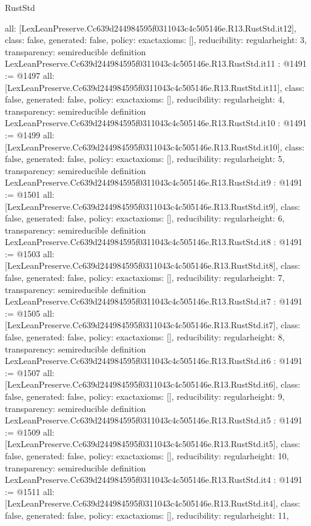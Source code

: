 \begin{lexlean}{RustStd}
\begin{coremodule}
{  all: [LexLeanPreserve.Cc639d244984595f0311043c4c505146e.R13.RustStd.it12],
  class: false,
  generated: false,
  policy: exact{axioms: []},
  reducibility: regular{height: 3},
  transparency: semireducible
}
definition LexLeanPreserve.Cc639d244984595f0311043c4c505146e.R13.RustStd.it11 : @1491 := @1497 {
  all: [LexLeanPreserve.Cc639d244984595f0311043c4c505146e.R13.RustStd.it11],
  class: false,
  generated: false,
  policy: exact{axioms: []},
  reducibility: regular{height: 4},
  transparency: semireducible
}
definition LexLeanPreserve.Cc639d244984595f0311043c4c505146e.R13.RustStd.it10 : @1491 := @1499 {
  all: [LexLeanPreserve.Cc639d244984595f0311043c4c505146e.R13.RustStd.it10],
  class: false,
  generated: false,
  policy: exact{axioms: []},
  reducibility: regular{height: 5},
  transparency: semireducible
}
definition LexLeanPreserve.Cc639d244984595f0311043c4c505146e.R13.RustStd.it9 : @1491 := @1501 {
  all: [LexLeanPreserve.Cc639d244984595f0311043c4c505146e.R13.RustStd.it9],
  class: false,
  generated: false,
  policy: exact{axioms: []},
  reducibility: regular{height: 6},
  transparency: semireducible
}
definition LexLeanPreserve.Cc639d244984595f0311043c4c505146e.R13.RustStd.it8 : @1491 := @1503 {
  all: [LexLeanPreserve.Cc639d244984595f0311043c4c505146e.R13.RustStd.it8],
  class: false,
  generated: false,
  policy: exact{axioms: []},
  reducibility: regular{height: 7},
  transparency: semireducible
}
definition LexLeanPreserve.Cc639d244984595f0311043c4c505146e.R13.RustStd.it7 : @1491 := @1505 {
  all: [LexLeanPreserve.Cc639d244984595f0311043c4c505146e.R13.RustStd.it7],
  class: false,
  generated: false,
  policy: exact{axioms: []},
  reducibility: regular{height: 8},
  transparency: semireducible
}
definition LexLeanPreserve.Cc639d244984595f0311043c4c505146e.R13.RustStd.it6 : @1491 := @1507 {
  all: [LexLeanPreserve.Cc639d244984595f0311043c4c505146e.R13.RustStd.it6],
  class: false,
  generated: false,
  policy: exact{axioms: []},
  reducibility: regular{height: 9},
  transparency: semireducible
}
definition LexLeanPreserve.Cc639d244984595f0311043c4c505146e.R13.RustStd.it5 : @1491 := @1509 {
  all: [LexLeanPreserve.Cc639d244984595f0311043c4c505146e.R13.RustStd.it5],
  class: false,
  generated: false,
  policy: exact{axioms: []},
  reducibility: regular{height: 10},
  transparency: semireducible
}
definition LexLeanPreserve.Cc639d244984595f0311043c4c505146e.R13.RustStd.it4 : @1491 := @1511 {
  all: [LexLeanPreserve.Cc639d244984595f0311043c4c505146e.R13.RustStd.it4],
  class: false,
  generated: false,
  policy: exact{axioms: []},
  reducibility: regular{height: 11},
}
\end{coremodule}
\end{lexlean}
